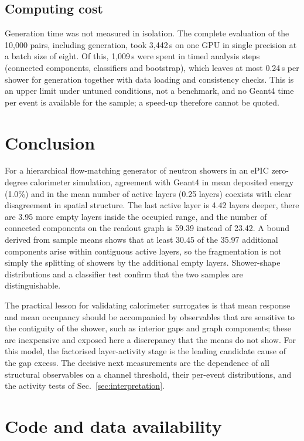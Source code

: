 \documentclass[11pt]{article}
\begin{document}
\subsection{Computing cost}

Generation time was not measured in isolation. The complete evaluation of the 10,000 pairs, including generation, took 3,442\,s on one GPU in single precision at a batch size of eight. Of this, 1,009\,s were spent in timed analysis steps (connected components, classifiers and bootstrap), which leaves at most 0.24\,s per shower for generation together with data loading and consistency checks. This is an upper limit under untuned conditions, not a benchmark, and no Geant4 time per event is available for the sample; a speed-up therefore cannot be quoted.

\section{Conclusion}

For a hierarchical flow-matching generator of neutron showers in an ePIC zero-degree calorimeter simulation, agreement with Geant4 in mean deposited energy (1.0\%) and in the mean number of active layers (0.25 layers) coexists with clear disagreement in spatial structure. The last active layer is 4.42 layers deeper, there are 3.95 more empty layers inside the occupied range, and the number of connected components on the readout graph is 59.39 instead of 23.42. A bound derived from sample means shows that at least 30.45 of the 35.97 additional components arise within contiguous active layers, so the fragmentation is not simply the splitting of showers by the additional empty layers. Shower-shape distributions and a classifier test confirm that the two samples are distinguishable.

The practical lesson for validating calorimeter surrogates is that mean response and mean occupancy should be accompanied by observables that are sensitive to the contiguity of the shower, such as interior gaps and graph components; these are inexpensive and exposed here a discrepancy that the means do not show. For this model, the factorised layer-activity stage is the leading candidate cause of the gap excess. The decisive next measurements are the dependence of all structural observables on a channel threshold, their per-event distributions, and the activity tests of Sec.~\ref{sec:interpretation}.

\section*{Code and data availability}
\end{document}
